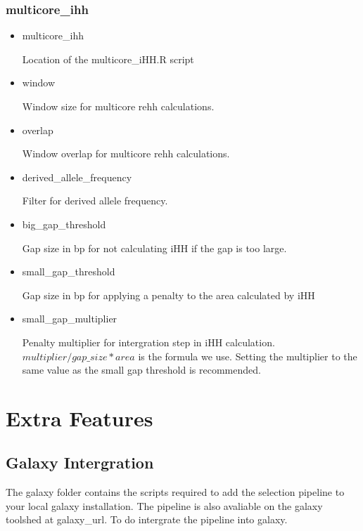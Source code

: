 \documentclass[a4paper,10pt]{article}
\begin{document}
\subsubsection{multicore\_ihh}
\begin{itemize}
\item multicore\_ihh

Location of the multicore\_iHH.R script

\item window

Window size for multicore rehh calculations.  

\item overlap

Window overlap for multicore rehh calculations.

\item derived\_allele\_frequency

Filter for derived allele frequency.

\item big\_gap\_threshold

Gap size in bp for not calculating iHH if the gap is too large.

\item small\_gap\_threshold

Gap size in bp for applying a penalty to the area calculated by iHH

\item small\_gap\_multiplier

Penalty multiplier for intergration step in iHH calculation. $multiplier/gap\_size * area$ is the formula we use. Setting the multiplier to the same value as the small gap threshold is recommended. 

\end{itemize}
\section{Extra Features}

\subsection{Galaxy Intergration}
The galaxy folder contains the scripts required to add the selection pipeline to your local galaxy installation. The pipeline is also avaliable on the galaxy toolshed at galaxy\_url. To do intergrate the pipeline into galaxy.
\end{document}

